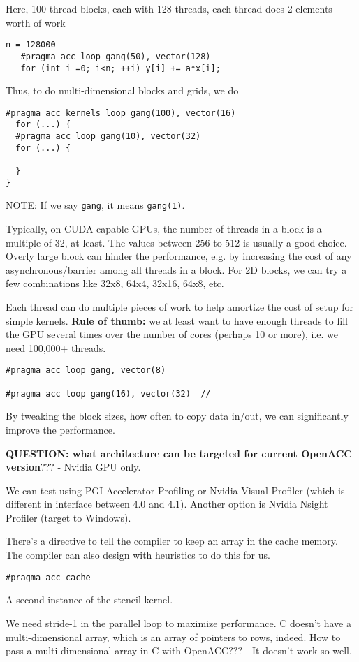 Here, 100 thread blocks, each with 128 threads, each thread does 2
elements worth of work
\begin{verbatim}
n = 128000
   #pragma acc loop gang(50), vector(128)
   for (int i =0; i<n; ++i) y[i] += a*x[i];
\end{verbatim}

Thus, to do multi-dimensional blocks and grids, we do
\begin{verbatim}
#pragma acc kernels loop gang(100), vector(16)
  for (...) {
  #pragma acc loop gang(10), vector(32)
  for (...) {
  
  }
}
\end{verbatim}
NOTE: If we say \verb!gang!, it means \verb!gang(1)!. 

Typically, on CUDA-capable GPUs, the number of threads in a block is a multiple
of 32, at least. The values between 256 to 512 is usually a good choice. Overly
large block can hinder the performance, e.g. by increasing the cost of any
asynchronous/barrier among all threads in a block. For 2D blocks, we can try a
few combinations like 32x8, 64x4, 32x16, 64x8, etc.

Each thread can do multiple pieces of work to help amortize the cost of setup
for simple kernels. {\bf Rule of thumb:} we at least want to have enough threads
to fill the GPU several times over the number of cores (perhaps 10 or more),
i.e. we need 100,000+ threads. 
\begin{verbatim}
#pragma acc loop gang, vector(8)

#pragma acc loop gang(16), vector(32)  // 
\end{verbatim}
By tweaking the block sizes, how often to copy data in/out, we can significantly
improve the performance.

{\bf QUESTION: what architecture can be targeted for current OpenACC version}???
- Nvidia GPU only. 

We can test using PGI Accelerator Profiling or Nvidia Visual Profiler (which is
different in interface between 4.0 and 4.1). Another option is Nvidia Nsight
Profiler (target to Windows). 

There's a directive to tell the compiler to keep an array in the cache memory.
The compiler can also design with heuristics to do this for us.
\begin{verbatim}
#pragma acc cache
\end{verbatim} 

A second instance of the stencil kernel. 

We need stride-1 in the parallel loop to maximize performance. C doesn't have a
multi-dimensional array, which is an array of pointers to rows, indeed. How to
pass a multi-dimensional array in C with OpenACC??? - It doesn't work so well. 

